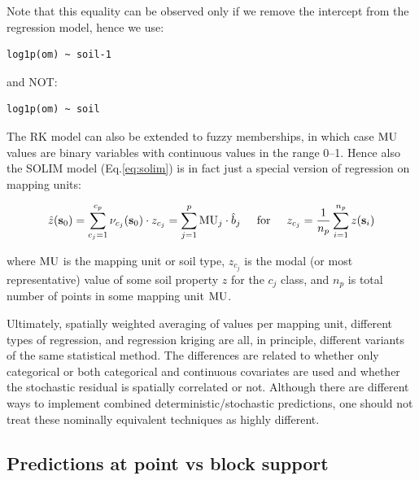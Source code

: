 \documentclass[11pt]{krantz}
\theoremstyle{definition}
\theoremstyle{definition}
\theoremstyle{definition}
\theoremstyle{remark}
\begin{document}
Note that this equality can be observed only if we remove the intercept
from the regression model, hence we use:

\begin{verbatim}
log1p(om) ~ soil-1
\end{verbatim}

and NOT:

\begin{verbatim}
log1p(om) ~ soil
\end{verbatim}

The RK model can also be extended to fuzzy memberships, in which case
\({\rm{MU}}\) values are binary variables with continuous values in the
range 0--1. Hence also the SOLIM model (Eq.\eqref{eq:solim}) is in fact
just a special version of regression on mapping units:

\begin{equation}
\hat z({\bf{s}}_0 ) = \sum\limits_{c_j = 1}^{c_p} {\nu _{c_j} ({\bf{s}}_0) \cdot z_{c_j} } = \sum\limits_{j = 1}^p { {\rm{MU}}_j \cdot \hat b_j}  \hspace{.5cm} {\rm {for}}  \hspace{.5cm}  z_{c_j} = \frac{1}{{n_p }}\sum\limits_{i = 1}^{n_p } {z({\bf{s}}_i )}
\label{eq:SOLIMreg}
\end{equation}

where \({\rm{MU}}\) is the mapping unit or soil type, \(z_{c_j}\) is the
modal (or most representative) value of some soil property \(z\) for the
\(c_j\) class, and \(n_p\) is total number of points in some mapping
unit \({\rm{MU}}\).

Ultimately, spatially weighted averaging of values per mapping unit,
different types of regression, and regression kriging are all, in
principle, different variants of the same statistical method. The
differences are related to whether only categorical or both categorical
and continuous covariates are used and whether the stochastic residual
is spatially correlated or not. Although there are different ways to
implement combined deterministic/stochastic predictions, one should not
treat these nominally equivalent techniques as highly different.

\hypertarget{block-support}{%
\subsection{Predictions at point vs block support}\label{block-support}}
\end{document}
